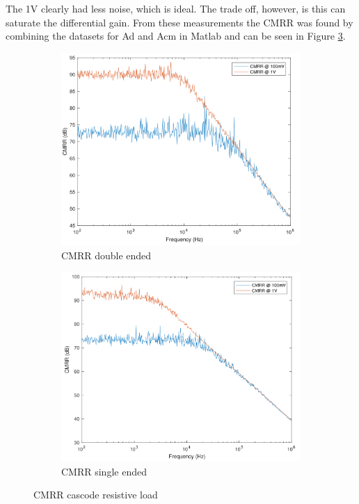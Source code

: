 The 1V clearly had less noise, which is ideal. The trade off, however, is this can saturate the differential gain. From these measurements the CMRR was found by combining the datasets for Ad and Acm in Matlab and can be seen in Figure \ref{fig:CMRR_cascode}.


\begin{figure}[H]
    \centering
    \begin{subfigure}[b]{0.45\textwidth}
        \centering
        \includegraphics[width=\textwidth]{ExperimentalImplementation/CMRR_cascode_resist_double.png}
        \caption{CMRR double ended}
        \label{fig:blue_led}
    \end{subfigure}
    \hfill
    \begin{subfigure}[b]{0.45\textwidth}
        \centering
        \includegraphics[width=\textwidth]{ExperimentalImplementation/CMRR_cascode_single_resist.png}
        \caption{CMRR single ended}
        \label{fig:blue_led}
    \end{subfigure}
    \caption{CMRR cascode resistive load}
    \label{fig:CMRR_cascode}
\end{figure} 

